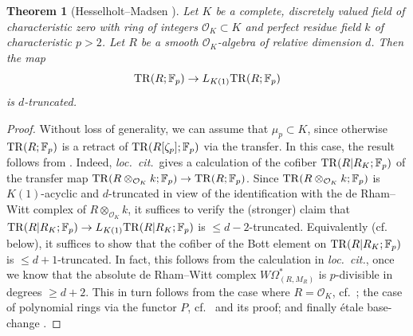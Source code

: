 \documentclass{amsart}
\newtheorem{theorem}{Theorem}[section]
\theoremstyle{definition}
\begin{document}
\begin{theorem}[Hesselholt--Madsen \cite{HM03, HM04}] 
\label{HMasymptotic}
Let $K$ be a complete, discretely valued field of characteristic zero 
with ring of integers $\mathcal{O}_K \subset K$  and perfect residue field $k$ of characteristic $p > 2$.
Let $R$ be a smooth $\mathcal{O}_K$-algebra of relative dimension $d$. 
Then the map
\[  \mathrm{TR}(R; \mathbb{F}_p) \to L_{K(1)} \mathrm{TR}(R; \mathbb{F}_p)   \]
is $d$-truncated. 
\end{theorem} 
\begin{proof} 
Without loss of generality, we can assume that $\mu_p \subset K$, since
otherwise $\mathrm{TR}(R; \mathbb{F}_p)$ is a retract of $\mathrm{TR}(R[\zeta_p];
\mathbb{F}_p)$ via the transfer. 
In this case, the result follows from 
\cite[Th.~E]{HM04}. 
Indeed, 
\emph{loc.~cit.}~gives a calculation of 
the cofiber $\mathrm{TR}(R|R_K; \mathbb{F}_p)$ of the transfer map $\mathrm{TR}(R \otimes_{\mathcal{O}_K} k; \mathbb{F}_p) \to \mathrm{TR}(R;
\mathbb{F}_p)$. 
Since $\mathrm{TR}(R \otimes_{\mathcal{O}_K} k; \mathbb{F}_p)$ is $K(1)$-acyclic and
$d$-truncated
in view of the identification \cite{Hes96} with the de Rham--Witt complex of $R
\otimes_{\mathcal{O}_K} k$, 
it suffices to 
verify the (stronger) claim that 
$\mathrm{TR}(R|R_K; \mathbb{F}_p) \to 
L_{K(1)}\mathrm{TR}(R|R_K; \mathbb{F}_p)
$ is $\leq  d-2$-truncated. 
Equivalently (cf.~ below), it suffices to show that the cofiber of the Bott element on 
$\mathrm{TR}(R|R_K; \mathbb{F}_p)$ is 
$\leq d+1$-truncated. 
In fact, this follows from the calculation in 
\emph{loc.~cit.}, 
once we know that the absolute de Rham--Witt complex
$W \Omega^{\ast}_{(R, M_R)}$ is $p$-divisible in degrees $\geq d+2$. 
This in turn follows from the case
where $R = \mathcal{O}_K$, cf.~\cite[Cor.~3.2.7]{HM03}; the case of polynomial
rings 
via the functor $P$, cf.~\cite[Lem.~7.1.4]{HM04} and its proof; and 
finally \'etale base-change \cite[Lem~7.1.1]{HM04}. 
\end{proof} 
\end{document}
